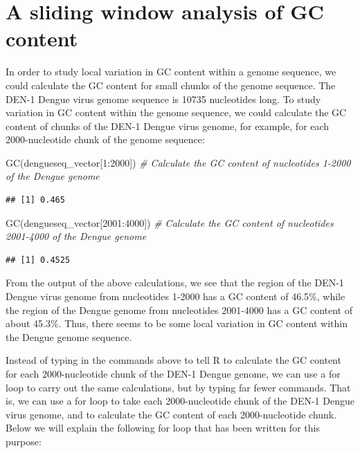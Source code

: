 \documentclass[
]{book}
\newenvironment{Shaded}{\begin{snugshade}}{\end{snugshade}}
\newcommand{\CommentTok}[1]{\textcolor[rgb]{0.56,0.35,0.01}{\textit{#1}}}
\newcommand{\DecValTok}[1]{\textcolor[rgb]{0.00,0.00,0.81}{#1}}
\newcommand{\FunctionTok}[1]{\textcolor[rgb]{0.00,0.00,0.00}{#1}}
\newcommand{\NormalTok}[1]{#1}
\newcommand{\SpecialCharTok}[1]{\textcolor[rgb]{0.00,0.00,0.00}{#1}}
\begin{document}
\hypertarget{a-sliding-window-analysis-of-gc-content}{%
\section{A sliding window analysis of GC content}\label{a-sliding-window-analysis-of-gc-content}}

In order to study local variation in GC content within a genome sequence, we could calculate the GC content for small chunks of the genome sequence. The DEN-1 Dengue virus genome sequence is 10735 nucleotides long. To study variation in GC content within the genome sequence, we could calculate the GC content of chunks of the DEN-1 Dengue virus genome, for example, for each 2000-nucleotide chunk of the genome sequence:

\begin{Shaded}
\begin{Highlighting}[]
\FunctionTok{GC}\NormalTok{(dengueseq\_vector[}\DecValTok{1}\SpecialCharTok{:}\DecValTok{2000}\NormalTok{])      }\CommentTok{\# Calculate the GC content of nucleotides 1{-}2000 of the Dengue genome}
\end{Highlighting}
\end{Shaded}

\begin{verbatim}
## [1] 0.465
\end{verbatim}

\begin{Shaded}
\begin{Highlighting}[]
\FunctionTok{GC}\NormalTok{(dengueseq\_vector[}\DecValTok{2001}\SpecialCharTok{:}\DecValTok{4000}\NormalTok{])   }\CommentTok{\# Calculate the GC content of nucleotides 2001{-}4000 of the Dengue genome}
\end{Highlighting}
\end{Shaded}

\begin{verbatim}
## [1] 0.4525
\end{verbatim}

From the output of the above calculations, we see that the region of the DEN-1 Dengue virus genome from nucleotides 1-2000 has a GC content of 46.5\%, while the region of the Dengue genome from nucleotides 2001-4000 has a GC content of about 45.3\%. Thus, there seems to be some local variation in GC content within the Dengue genome sequence.

Instead of typing in the commands above to tell R to calculate the GC content for each 2000-nucleotide chunk of the DEN-1 Dengue genome, we can use a for loop to carry out the same calculations, but by typing far fewer commands. That is, we can use a for loop to take each 2000-nucleotide chunk of the DEN-1 Dengue virus genome, and to calculate the GC content of each 2000-nucleotide chunk. Below we will explain the following for loop that has been written for this purpose:
\end{document}
